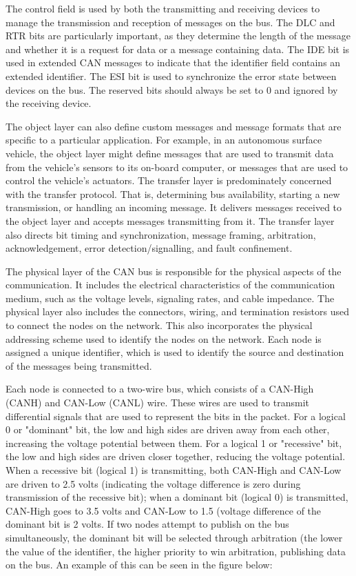 \documentclass[12pt]{article}
\begin{document}
    The control field is used by both the transmitting and receiving devices to manage the transmission and reception of messages on the bus. The DLC and RTR bits are particularly important, as they determine the length of the message and whether it is a request for data or a message containing data. The IDE bit is used in extended CAN messages to indicate that the identifier field contains an extended identifier. The ESI bit is used to synchronize the error state between devices on the bus. The reserved bits should always be set to 0 and ignored by the receiving device.

The object layer can also define custom messages and message formats that are specific to a particular application. 
For example, in an autonomous surface vehicle, the object layer might define messages that are used to transmit data from the vehicle's sensors to its on-board computer, or messages that are used to control the vehicle's actuators.
The transfer layer is predominately concerned with the transfer protocol.
That is, determining bus availability, starting a new transmission, or handling an incoming message. 
It delivers messages received to the object layer and accepts messages transmitting from it. 
The transfer layer also directs bit timing and synchronization, message framing, arbitration, acknowledgement, error detection/signalling, and fault confinement.

The physical layer of the CAN bus is responsible for the physical aspects of the communication. 
It includes the electrical characteristics of the communication medium, such as the voltage levels, signaling rates, and cable impedance. 
The physical layer also includes the connectors, wiring, and termination resistors used to connect the nodes on the network. 
This also incorporates the physical addressing scheme used to identify the nodes on the network. Each node is assigned a unique identifier, which is used to identify the source and destination of the messages being transmitted.

 Each node is connected to a two-wire bus, which consists of a CAN-High (CANH) and CAN-Low (CANL) wire.  These wires are used to transmit differential signals that are used to represent the bits in the packet. 
 For a logical 0 or "dominant" bit, the low and high sides are driven away from each other, increasing the voltage potential between them.
 For a logical 1 or "recessive" bit, the low and high sides are driven closer together, reducing the voltage potential. When a recessive bit (logical 1) is transmitting, both CAN-High and CAN-Low are driven to 2.5 volts (indicating the voltage difference is zero during transmission of the recessive bit); when a dominant bit (logical 0) is transmitted, CAN-High goes to 3.5 volts and CAN-Low to 1.5 (voltage difference of the dominant bit is 2 volts. If two nodes attempt to publish on the bus simultaneously, the dominant bit will be selected through arbitration (the lower the value of the identifier, the higher priority to win arbitration, publishing data on the bus.
 An example of this can be seen in the figure below:
 
\end{document}
